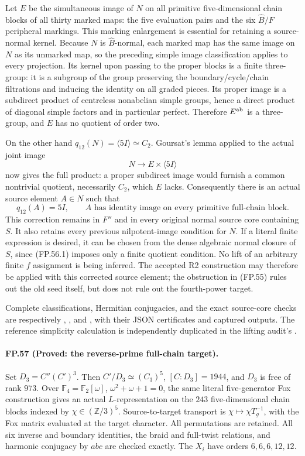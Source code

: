 Let $E$ be the simultaneous image of $N$ on all primitive
five-dimensional chain blocks of all thirty marked maps: the five
evaluation pairs and the six $\widehat B/F$ peripheral markings.
This marking enlargement is essential for retaining a source-normal
kernel. Because $N$ is $\widehat B$-normal, each marked map has
the same image on $N$ as its unmarked map, so the preceding simple
image classification applies to every projection.
Its kernel upon passing to the proper blocks is a finite three-group:
it is a subgroup of the group preserving the boundary/cycle/chain
filtrations and inducing the identity on all graded pieces.
Its proper image is a subdirect product of centreless nonabelian
simple groups, hence a direct product of diagonal simple factors
and in particular perfect. Therefore $E^{\rm ab}$ is a three-group,
and $E$ has no quotient of order two.

On the other hand $q_{12}(N)=\langle5I\rangle\simeq C_2$.
Goursat's lemma applied to the actual joint image
\[
                      N\longrightarrow E\times\langle5I\rangle
\]
now gives the full product: a proper subdirect image would furnish
a common nontrivial quotient, necessarily $C_2$, which $E$ lacks.
Consequently there is an actual source element $A\in N$ such that
\[
 q_{12}(A)=5I,\qquad
 A\text{ has identity image on every primitive full-chain block}.
 \tag{FP.56.1}
\]
This correction remains in $F''$ and in every original normal source
core containing $S$. It also retains every previous nilpotent-image
condition for $N$. If a literal finite expression is desired, it
can be chosen from the dense algebraic normal closure of $S$,
since (FP.56.1) imposes only a finite quotient condition.
No lift of an arbitrary finite $f$ assignment is being inferred.
The accepted R2 construction may therefore be applied with this
corrected source element; the obstruction in (FP.55) rules out the
old seed itself, but does not rule out the fourth-power target.

Complete classifications, Hermitian conjugacies, and the exact
source-core checks are respectively
,
, and
, with their
JSON certificates and captured outputs. The reference simplicity
calculation is independently duplicated in the lifting audit's
.

\paragraph{FP.57 (Proved: the reverse-prime full-chain target).}
Set $D_3=C''(C')^3$. Then $C'/D_3\simeq(C_3)^5$,
$[C:D_3]=1944$, and $D_3$ is free of rank $973$.
Over $\mathbb F_4=\mathbb F_2[\omega]$, $\omega^2+\omega+1=0$,
the same literal five-generator Fox construction gives an actual
$L$-representation on the $243$ five-dimensional chain blocks
indexed by $\chi\in(\mathbb Z/3)^5$. Source-to-target transport
is $\chi\mapsto\chi T_g^{-1}$, with the Fox matrix evaluated
at the target character. All permutations are retained.
All six inverse and boundary identities, the braid and full-twist
relations, and harmonic conjugacy by $abc$ are checked exactly.
The $X_i$ have orders $6,6,6,12,12$.

